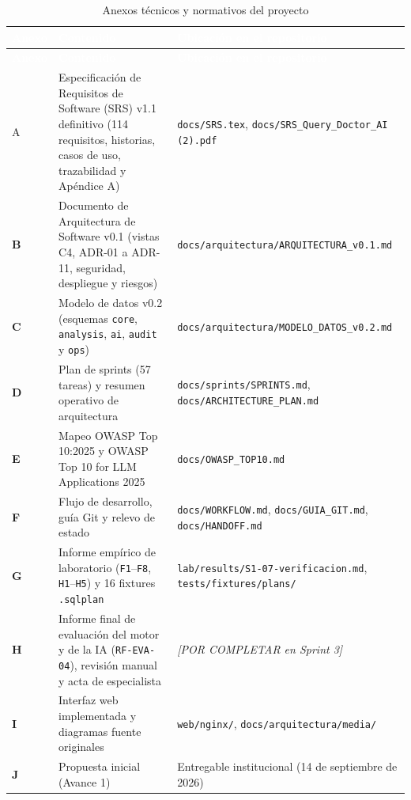 \documentclass[12pt,a4paper]{article}
\begin{document}
\begingroup
{}
\scriptsize
\begin{longtable}{>{\bfseries}p{} p{} p{}}
\toprule
\rowcolor{utbblue}
\textcolor{white}{\textbf{Anexo}} & \textcolor{white}{\textbf{Contenido}} & \textcolor{white}{\textbf{Ubicación en el repositorio}} \\
\midrule
\endfirsthead
\toprule
\rowcolor{utbblue}
\textcolor{white}{\textbf{Anexo}} & \textcolor{white}{\textbf{Contenido}} & \textcolor{white}{\textbf{Ubicación en el repositorio}} \\
\midrule
\endhead
\bottomrule
\caption{Anexos técnicos y normativos del proyecto}
\label{tab:anexos}
\endlastfoot
A & Especificación de Requisitos de Software (SRS) v1.1 definitivo (114 requisitos, historias, casos de uso, trazabilidad y Apéndice A) & \texttt{docs/SRS.tex}, \texttt{docs/SRS\_Query\_Doctor\_AI (2).pdf} \\
B & Documento de Arquitectura de Software v0.1 (vistas C4, ADR-01 a ADR-11, seguridad, despliegue y riesgos) & \texttt{docs/arquitectura/ARQUITECTURA\_v0.1.md} \\
C & Modelo de datos v0.2 (esquemas \texttt{core}, \texttt{analysis}, \texttt{ai}, \texttt{audit} y \texttt{ops}) & \texttt{docs/arquitectura/MODELO\_DATOS\_v0.2.md} \\
D & Plan de sprints (57 tareas) y resumen operativo de arquitectura & \texttt{docs/sprints/SPRINTS.md}, \texttt{docs/ARCHITECTURE\_PLAN.md} \\
E & Mapeo OWASP Top 10:2025 y OWASP Top 10 for LLM Applications 2025 & \texttt{docs/OWASP\_TOP10.md} \\
F & Flujo de desarrollo, guía Git y relevo de estado & \texttt{docs/WORKFLOW.md}, \texttt{docs/GUIA\_GIT.md}, \texttt{docs/HANDOFF.md} \\
G & Informe empírico de laboratorio (\texttt{F1}--\texttt{F8}, \texttt{H1}--\texttt{H5}) y 16 fixtures \texttt{.sqlplan} & \texttt{lab/results/S1-07-verificacion.md}, \texttt{tests/fixtures/plans/} \\
H & Informe final de evaluación del motor y de la IA (\texttt{RF-EVA-04}), revisión manual y acta de especialista & \textit{[POR COMPLETAR en Sprint 3]} \\
I & Interfaz web implementada y diagramas fuente originales & \texttt{web/nginx/}, \texttt{docs/arquitectura/media/} \\
J & Propuesta inicial (Avance 1) & Entregable institucional (14 de septiembre de 2026) \\
\end{longtable}
\endgroup
\end{document}

